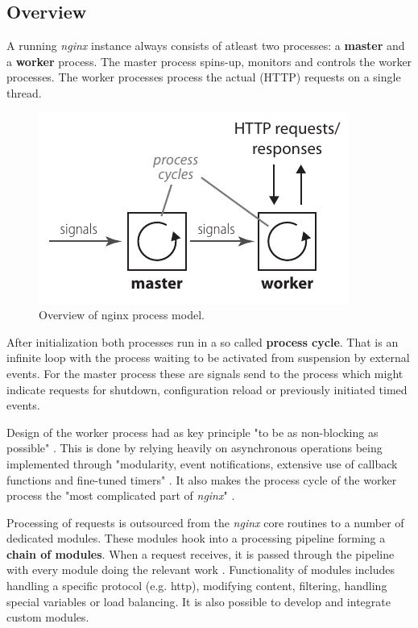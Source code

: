 \subsection{Overview}

A running \textit{nginx} instance always consists of atleast two processes: a \textbf{master} and a \textbf{worker} process. The master process spins-up, monitors and controls the worker processes. The worker processes process the actual (HTTP) requests on a single thread.

\begin{figure}
	\centering
	\includegraphics[scale=1]{images/nginx-overview.pdf}
	\caption{Overview of nginx process model.}
	\label{fig:nginx-overview}
\end{figure}

After initialization both processes run in a so called \textbf{process cycle}. That is an infinite loop with the process waiting to be activated from suspension by external events. For the master process these are signals send to the process which might indicate requests for shutdown, configuration reload or previously initiated timed events.

Design of the worker process had as key principle "to be as non-blocking as possible" \cite{aosa}. This is done by relying heavily on asynchronous operations being implemented through "modularity, event notifications, extensive use of callback functions and fine-tuned timers" \cite{aosa}. It also makes the process cycle of the worker process the "most complicated part of \textit{nginx}" \cite{aosa}.

Processing of requests is outsourced from the \textit{nginx} core routines to a number of dedicated modules. These modules hook into a processing pipeline forming a \textbf{chain of modules}. When a request receives, it is passed through the pipeline with every module doing the relevant work \cite{aosa}. Functionality of modules includes handling a specific protocol (e.g. \gls{http}), modifying content, filtering, handling special variables or load balancing. It is also possible to develop and integrate custom modules.

